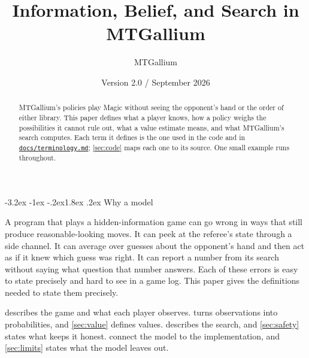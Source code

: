 \documentclass[11pt,a4paper]{article}
\title{\sffamily\bfseries\color{ink}Information, Belief, and Search in MTGallium}
\author{MTGallium}
\date{Version 2.0 \quad/\quad 23 September 2026}
\makeatletter
\renewcommand\section{\@startsection{section}{1}{\z@}
  {-3.2ex \@plus -1ex \@minus -.2ex}{1.8ex \@plus .2ex}
  {\normalfont\Large\sffamily\bfseries\color{ink}}}
\theoremstyle{plain}
\theoremstyle{definition}
\newcommand{\code}[1]{\texttt{\small #1}}
\makeatother
\begin{document}
\maketitle

\begin{abstract}
MTGallium's policies play Magic without seeing the opponent's hand or the
order of either library. This paper defines what a player knows, how a policy
weighs the possibilities it cannot rule out, what a value estimate means, and
what MTGallium's search computes. Each term it defines is the one used in the
code and in \href{https://github.com/huxinq/MTGallium/blob/main/docs/terminology.md}{\code{docs/terminology.md}};
\cref{sec:code} maps each one to its source.
One small example runs throughout.
\end{abstract}

\section{Why a model}

A program that plays a hidden-information game can go wrong in ways that
still produce reasonable-looking moves. It can peek at the referee's state
through a side channel. It can average over guesses about the opponent's hand
and then act as if it knew which guess was right. It can report a number
from its search without saying what question that number answers. Each of
these errors is easy to state precisely and hard to see in a game log. This
paper gives the definitions needed to state them precisely.

 describes the game and what each player observes.
 turns observations into probabilities, and
\cref{sec:value} defines values.  describes the search, and
\cref{sec:safety} states what keeps it honest. 
connect the model to the implementation, and \cref{sec:limits} states what the
model leaves out.
\end{document}
